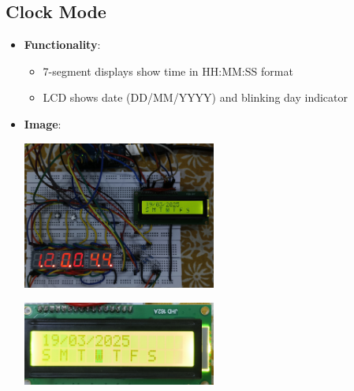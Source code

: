 \documentclass{article}
\begin{document}
\subsection{Clock Mode}
\begin{itemize}
    \item \textbf{Functionality}:
    \begin{itemize}
        \item 7-segment displays show time in HH:MM:SS format
        \item LCD shows date (DD/MM/YYYY) and blinking day indicator
    \end{itemize}
    \item \textbf{Image}:
    \begin{center}
        \includegraphics[width=0.5\textwidth]{figs/1.jpg}
    \end{center}
		\begin{center}
        \includegraphics[width=0.5\textwidth]{figs/4.jpg}
    \end{center}
\end{itemize}
\end{document}
